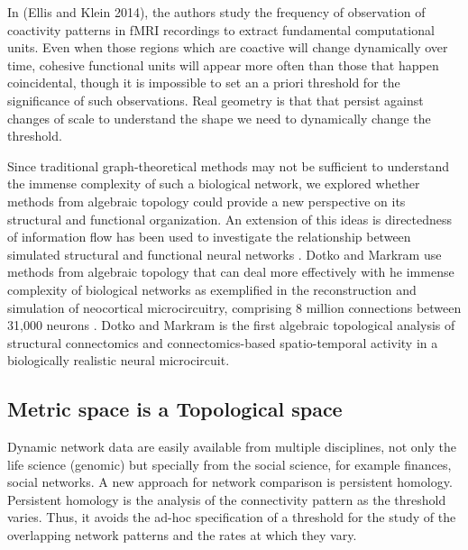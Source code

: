 \documentclass[onecollarge,runningheads]{svjour2}
\begin{document}
In (Ellis and Klein 2014), the authors study the frequency of observation of coactivity patterns in fMRI recordings to extract fundamental computational units. Even when those regions which are coactive will change dynamically over time, cohesive functional units will appear more often than those that happen coincidental, though it is impossible to set an a priori threshold for the significance of such observations.
Real geometry is that that persist against changes of scale to understand the shape we need to dynamically change the threshold.

Since traditional graph-theoretical methods may not be sufficient to understand the immense complexity of such a biological network, we explored whether methods from algebraic topology could provide a new perspective on its structural and functional organization. 
An extension of this ideas is directedness of information flow has been used to investigate the relationship between simulated structural and functional neural networks \citep{dotko2016topological}. %
Dotko and Markram use methods from algebraic topology that can deal more effectively with he immense complexity of biological networks 
as exemplified in the reconstruction and simulation of neocortical microcircuitry, comprising 8 million connections between 31,000 neurons \citep{markram2015reconstruction}. Dotko and Markram is the first algebraic topological analysis of structural connectomics and connectomics-based spatio-temporal activity in a biologically realistic neural microcircuit.  


\subsection{Metric space is a Topological space}
\label{sec:1}


Dynamic network data are easily available from multiple disciplines, not only the life science (genomic) but specially from the social science, for example finances, social networks. A new approach for network comparison is persistent homology. Persistent homology is the analysis of the connectivity pattern as the threshold varies. Thus, it avoids the ad-hoc specification of a threshold for the study of the overlapping network patterns and the rates at which they vary.
\end{document}
